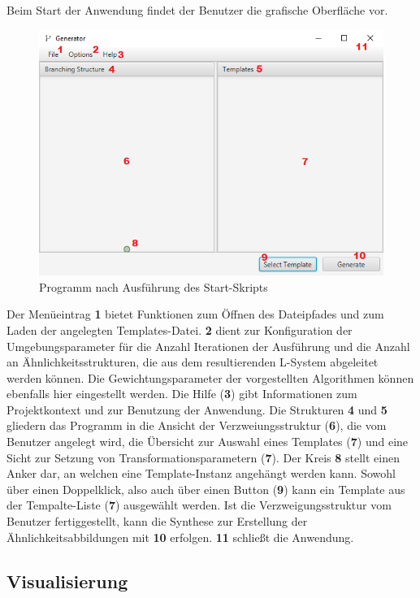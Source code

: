 Beim Start der Anwendung findet der Benutzer die grafische Oberfläche vor.
\begin{figure}[H]
    \centering
    \includegraphics[width=14cm]{../images/UI_numbers.png}
    \caption{Programm nach Ausführung des Start-Skripts}
\end{figure}
Der Menüeintrag \textbf{1} bietet Funktionen zum Öffnen des Dateipfades und zum Laden der angelegten Templates-Datei.
\textbf{2} dient zur Konfiguration der Umgebungsparameter für die Anzahl Iterationen der Ausführung
und die Anzahl an Ähnlichkeitsstrukturen, die aus dem resultierenden L-System abgeleitet werden können.
Die Gewichtungsparameter der vorgestellten Algorithmen können ebenfalls hier eingestellt werden.
Die Hilfe (\textbf{3}) gibt Informationen zum Projektkontext und zur Benutzung der Anwendung.
Die Strukturen \textbf{4} und \textbf{5} gliedern das Programm in die Ansicht der Verzweiungsstruktur (\textbf{6}), die vom Benutzer
angelegt wird, die Übersicht zur Auswahl eines Templates (\textbf{7}) und eine Sicht zur Setzung von Transformationsparametern (\textbf{7}).
Der Kreis \textbf{8} stellt einen Anker dar, an welchen eine Template-Instanz angehängt werden kann.
Sowohl über einen Doppelklick, also auch über einen Button (\textbf{9}) kann ein Template aus der Tempalte-Liste (\textbf{7})
ausgewählt werden.
Ist die Verzweigungsstruktur vom Benutzer fertiggestellt, kann die Synthese zur Erstellung der Ähnlichkeitsabbildungen
mit \textbf{10} erfolgen.
\textbf{11} schließt die Anwendung.

\subsection*{Visualisierung}

